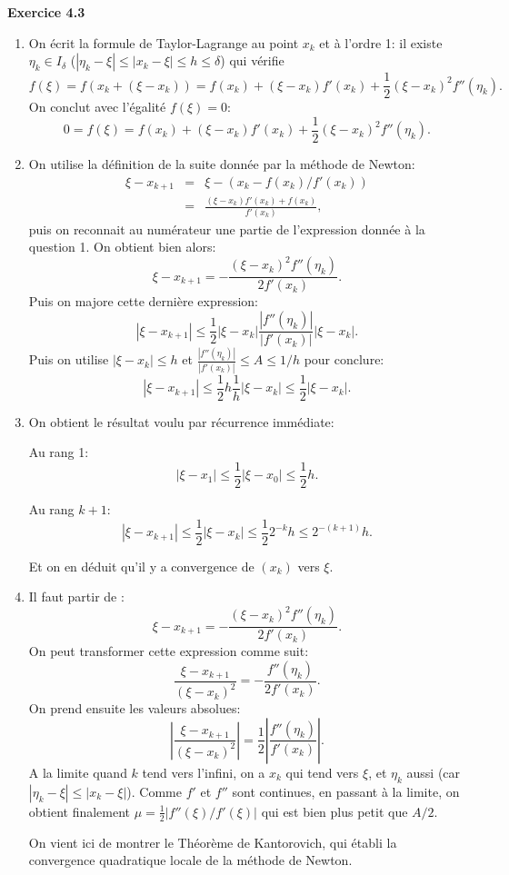 \documentclass{article}
\begin{document}
{\bf Exercice 4.3}

\begin{enumerate}
    \item On écrit la formule de Taylor-Lagrange au point $x_k$ et à l'ordre 1: il existe $\eta_k \in I_\delta$ ($|\eta_k - \xi| \leq |x_k - \xi| \leq h \leq \delta$) qui vérifie
    \[
    f(\xi) = f(x_k + (\xi - x_k)) = f(x_k) + (\xi - x_k)f'(x_k) + \frac12 (\xi - x_k)^2 f''(\eta_k).
    \]
    On conclut avec l'égalité $f(\xi)=0$:
    \[
    0 = f(\xi)  = f(x_k) + (\xi - x_k)f'(x_k) + \frac12 (\xi - x_k)^2 f''(\eta_k).
    \]
    
    
    \item On utilise la définition de la suite donnée par la méthode de Newton:
    \begin{eqnarray*}
    \xi - x_{k+1} &=& \xi - (x_k - f(x_k)/f'(x_k) )\\
    &=& \frac{(\xi-x_k)f'(x_k) + f(x_k)}{f'(x_k)},
    \end{eqnarray*}
    puis on reconnait au numérateur une partie de l'expression donnée à la question 1. 
    On obtient bien alors:
    \[
    \xi - x_{k+1} = - \frac{(\xi - x_k)^2 f''(\eta_k)}{2 f'(x_k)}.
    \]
    Puis on majore cette dernière expression:
    \[
    | \xi - x_{k+1} | \leq \frac12 |\xi - x_k| \frac{|f''(\eta_k)|}{|f'(x_k)|} |\xi - x_k|.
    \]
    Puis on utilise $|\xi - x_k| \leq h$ et $\frac{|f''(\eta_k)|}{|f'(x_k)|} \leq A \leq 1/h$ pour conclure:
    \[
    | \xi - x_{k+1} | \leq \frac12 h \frac{1}{h} |\xi - x_k| \leq \frac12 |\xi - x_k|.
    \]
    \item On obtient le résultat voulu par récurrence immédiate:
    
    Au rang 1:
    \[
    | \xi - x_{1} |  \leq \frac12 |\xi - x_0| \leq \frac12 h.
    \]

    Au rang $k+1$:
    \[
    | \xi - x_{k+1} |  \leq \frac12 |\xi - x_k| \leq \frac12 2^{-k} h
    \leq 2^{-(k+1)} h.
    \]
    
    Et on en déduit qu'il y a convergence de $(x_k)$ vers $\xi$.
    
    \item Il faut partir de :
     \[
    \xi - x_{k+1} = - \frac{(\xi - x_k)^2 f''(\eta_k)}{2 f'(x_k)}.
    \]
    On peut transformer cette expression comme suit:
     \[
    \frac{\xi - x_{k+1}}{(\xi - x_k)^2} = - \frac{f''(\eta_k)}{2 f'(x_k)}.
    \]
    On prend ensuite les valeurs absolues:
     \[
    \left | \frac{\xi - x_{k+1}}{(\xi - x_k)^2} \right | = \frac12 \left |\frac{f''(\eta_k)}{f'(x_k)} \right |.
    \]
    A la limite quand $k$ tend vers l'infini, on a $x_k$ qui tend vers $\xi$, et $\eta_k$ aussi (car $|\eta_k-\xi|\leq|x_k -\xi|$). Comme $f'$ et $f''$ sont continues,
    en passant à la limite, on obtient finalement $\mu = \frac12|f''(\xi)/f'(\xi)|$ qui est bien plus petit que $A/2$.
    
    \medskip

    On vient ici de montrer le Théorème de Kantorovich, qui établi la convergence quadratique locale de la méthode de Newton.    
\end{enumerate}
\end{document}
